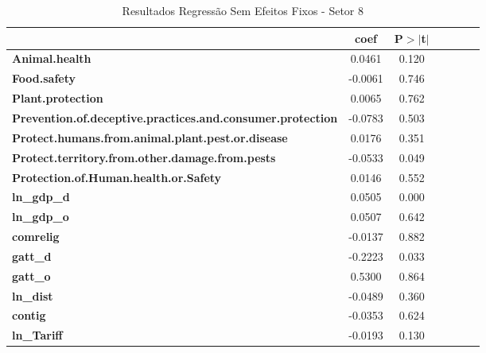 \begin{table}
    \begin{center}
        \begin{tabular}{lcccccc}
            & \textbf{coef} & \textbf{P$> |$t$|$}\\
            \midrule
\textbf{Animal.health}                                             &       0.0461 &     0.120     \\
\textbf{Food.safety}                                               &      -0.0061 &     0.746     \\
\textbf{Plant.protection}                                          &       0.0065 &     0.762     \\
\textbf{Prevention.of.deceptive.practices.and.consumer.protection} &      -0.0783 &     0.503     \\
\textbf{Protect.humans.from.animal.plant.pest.or.disease}          &       0.0176 &     0.351     \\
\textbf{Protect.territory.from.other.damage.from.pests}            &      -0.0533 &     0.049     \\
\textbf{Protection.of.Human.health.or.Safety}                      &       0.0146 &     0.552     \\
\textbf{ln\_gdp\_d}                                                &       0.0505 &     0.000     \\
\textbf{ln\_gdp\_o}                                                &       0.0507 &     0.642     \\
\textbf{comrelig}                                                  &      -0.0137 &     0.882     \\
\textbf{gatt\_d}                                                   &      -0.2223 &     0.033     \\
\textbf{gatt\_o}                                                   &       0.5300 &     0.864     \\
\textbf{ln\_dist}                                                  &      -0.0489 &     0.360     \\
\textbf{contig}                                                    &      -0.0353 &     0.624     \\
\textbf{ln\_Tariff}                                                &      -0.0193 &     0.130     \\
\bottomrule
\end{tabular}
\caption{ Resultados Regressão Sem Efeitos Fixos - Setor 8}
\end{center}
\end{table}